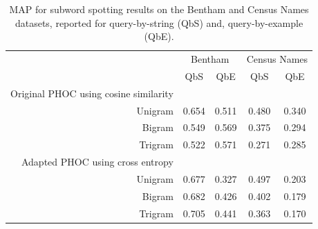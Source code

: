 \documentclass[ms,electronic,twosidetoc,letterpaper,chaptercenter,parttop,lof,lot]{byumsphd}
\begin{document}

\begin{table}
\centering
\begin{tabular}{| r | c c | c c |}
  \hline
   & \multicolumn{2}{c|}{Bentham} & \multicolumn{2}{c|}{Census Names}\\
   & QbS  & QbE    &  QbS &  QbE    \\
  \hline 
  Original PHOC using cosine similarity & & & & \\
  Unigram &  0.654 &  0.511  & 0.480 &  0.340 \\
  Bigram  &  0.549 &  0.569  & 0.375 &  0.294 \\
  Trigram &  0.522 &  0.571  & 0.271 &  0.285 \\
  \hline
  
  Adapted PHOC using cross entropy & & & & \\
  Unigram &  0.677 &  0.327  & 0.497 &  0.203 \\ 
  Bigram  &  0.682 &  0.426  & 0.402 &  0.179 \\
  Trigram &  0.705 &  0.441  & 0.363 &  0.170 \\
  \hline 
\end{tabular}
\caption{MAP for subword spotting results on the Bentham and Census Names datasets, reported for query-by-string (QbS) and, query-by-example (QbE).}
\label{tab:subwordspotting}
\end{table}
\end{document}
